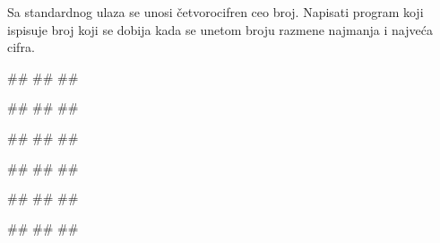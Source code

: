\begin{Exercise}[label=p1.2_08] 
 Sa standardnog ulaza se unosi četvorocifren ceo broj. Napisati program koji ispisuje broj koji se dobija kada se unetom broju razmene najmanja i najveća cifra. 
 
\begin{miditest}
\begin{upotreba}{1}
#\naslovInt#
##
##
\end{upotreba}
\end{miditest}
\begin{miditest}
\begin{upotreba}{2}
#\naslovInt#
##
##
\end{upotreba}
\end{miditest}

\begin{miditest}
\begin{upotreba}{1}
#\naslovInt#
##
##
\end{upotreba}
\end{miditest}
\begin{miditest}
\begin{upotreba}{2}
#\naslovInt#
##
##
\end{upotreba}
\end{miditest}

\begin{miditest}
\begin{upotreba}{3}
#\naslovInt#
##
##
\end{upotreba}
\end{miditest}
\begin{miditest}
\begin{upotreba}{4}
#\naslovInt#
##
##
\end{upotreba}
\end{miditest}
\end{Exercise}
\begin{Answer}[ref=p1.5_]
\end{Answer}


